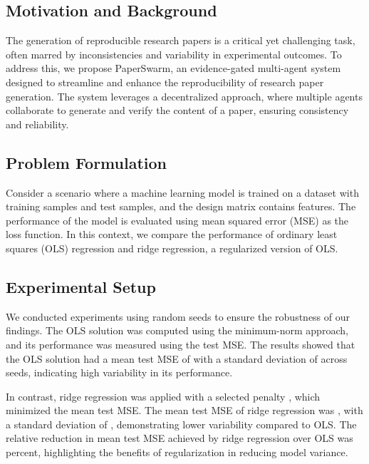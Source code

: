 \subsection{Motivation and Background}

The generation of reproducible research papers is a critical yet challenging task, often marred by inconsistencies and variability in experimental outcomes. To address this, we propose PaperSwarm, an evidence-gated multi-agent system designed to streamline and enhance the reproducibility of research paper generation. The system leverages a decentralized approach, where multiple agents collaborate to generate and verify the content of a paper, ensuring consistency and reliability.

\subsection{Problem Formulation}

Consider a scenario where a machine learning model is trained on a dataset with  training samples and  test samples, and the design matrix contains  features. The performance of the model is evaluated using mean squared error (MSE) as the loss function. In this context, we compare the performance of ordinary least squares (OLS) regression and ridge regression, a regularized version of OLS.

\subsection{Experimental Setup}

We conducted experiments using  random seeds to ensure the robustness of our findings. The OLS solution was computed using the minimum-norm approach, and its performance was measured using the test MSE. The results showed that the OLS solution had a mean test MSE of  with a standard deviation of  across seeds, indicating high variability in its performance.

In contrast, ridge regression was applied with a selected penalty , which minimized the mean test MSE. The mean test MSE of ridge regression was , with a standard deviation of , demonstrating lower variability compared to OLS. The relative reduction in mean test MSE achieved by ridge regression over OLS was  percent, highlighting the benefits of regularization in reducing model variance.


